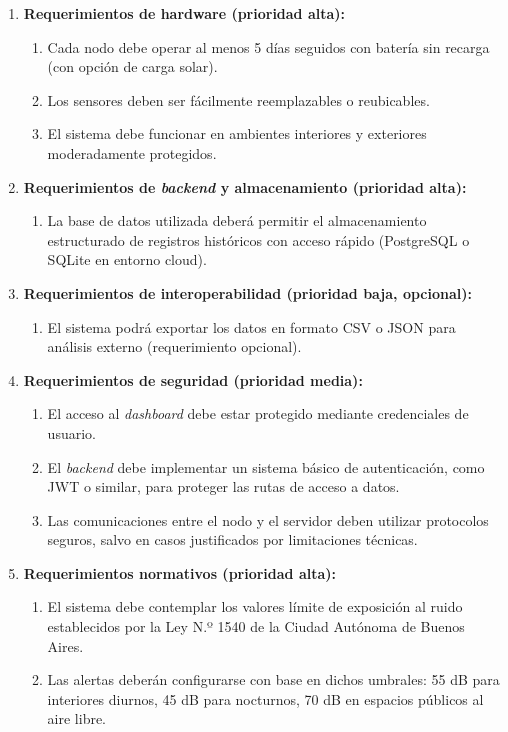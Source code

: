 \documentclass[
11pt, %
]{charter}
\begin{document}
\begin{enumerate}
    \item \textbf{Requerimientos de hardware (prioridad alta):}
    \begin{enumerate}
        \item Cada nodo debe operar al menos 5 días seguidos con batería sin recarga (con opción de carga solar).
        \item Los sensores deben ser fácilmente reemplazables o reubicables.
        \item El sistema debe funcionar en ambientes interiores y exteriores moderadamente protegidos.
    \end{enumerate}

    \item \textbf{Requerimientos de \textit{backend} y almacenamiento (prioridad alta):}
    \begin{enumerate}
        \item La base de datos utilizada deberá permitir el almacenamiento estructurado de registros históricos con acceso rápido (PostgreSQL o SQLite en entorno cloud).
    \end{enumerate}

    \item \textbf{Requerimientos de interoperabilidad (prioridad baja, opcional):}
    \begin{enumerate}
        \item El sistema podrá exportar los datos en formato CSV o JSON para análisis externo (requerimiento opcional).
    \end{enumerate}

    \item \textbf{Requerimientos de seguridad (prioridad media):}
    \begin{enumerate}
        \item El acceso al \textit{dashboard} debe estar protegido mediante credenciales de usuario.
        \item El \textit{backend} debe implementar un sistema básico de autenticación, como JWT o similar, para proteger las rutas de acceso a datos.
        \item Las comunicaciones entre el nodo y el servidor deben utilizar protocolos seguros, salvo en casos justificados por limitaciones técnicas.
    \end{enumerate}

    \item \textbf{Requerimientos normativos (prioridad alta):}
    \begin{enumerate}
        \item El sistema debe contemplar los valores límite de exposición al ruido establecidos por la Ley N.º 1540 de la Ciudad Autónoma de Buenos Aires.
        \item Las alertas deberán configurarse con base en dichos umbrales: 55 dB para interiores diurnos, 45 dB para nocturnos, 70 dB en espacios públicos al aire libre.
    \end{enumerate}



\end{enumerate}
\end{document}
